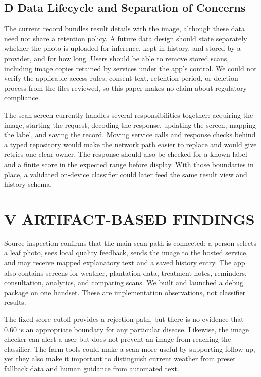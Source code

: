 \documentclass[conference]{IEEEtran}
\begin{document}
\subsection*{D Data Lifecycle and Separation of Concerns}

The current record bundles result details with the image, although these data need not share a retention policy. A future data design should state separately whether the photo is uploaded for inference, kept in history, and stored by a provider, and for how long. Users should be able to remove stored scans, including image copies retained by services under the app's control. We could not verify the applicable access rules, consent text, retention period, or deletion process from the files reviewed, so this paper makes no claim about regulatory compliance.

The scan screen currently handles several responsibilities together: acquiring the image, starting the request, decoding the response, updating the screen, mapping the label, and saving the record. Moving service calls and response checks behind a typed repository would make the network path easier to replace and would give retries one clear owner. The response should also be checked for a known label and a finite score in the expected range before display. With those boundaries in place, a validated on-device classifier could later feed the same result view and history schema.

\section*{V ARTIFACT-BASED FINDINGS}

Source inspection confirms that the main scan path is connected: a person selects a leaf photo, sees local quality feedback, sends the image to the hosted service, and may receive mapped explanatory text and a saved history entry. The app also contains screens for weather, plantation data, treatment notes, reminders, consultation, analytics, and comparing scans. We built and launched a debug package on one handset. These are implementation observations, not classifier results.

The fixed score cutoff provides a rejection path, but there is no evidence that 0.60 is an appropriate boundary for any particular disease. Likewise, the image checker can alert a user but does not prevent an image from reaching the classifier. The farm tools could make a scan more useful by supporting follow-up, yet they also make it important to distinguish current weather from preset fallback data and human guidance from automated text.
\end{document}
